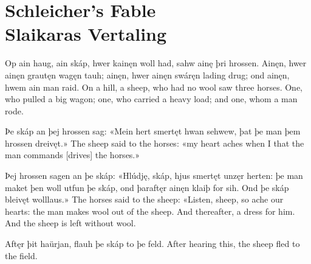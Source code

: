 \section{Schleicher's Fable\\Slaikaras Vertaling}

\begin{paracol}{2}
Op ain haug, ain skáp, hwer kainęn woll had, sahw ainę þri hrossen. Ainęn, hwer ainęn grautęn wagęn tauh; ainęn, hwer ainęn swáręn lading drug; ond ainęn, hwem ain man raid.
\switchcolumn
On a hill, a sheep, who had no wool saw three horses. One, who pulled a big wagon; one, who carried a heavy load; and one, whom a man rode.
\end{paracol}

\begin{paracol}{2}
Þe skáp an þej hrossen sag: «Mein hert smertęt hwan sehwew, þat þe man þem hrossen dreivęt.»
\switchcolumn
The sheep said to the horses: «my heart aches when I that the man commands [drives] the horses.»
\end{paracol}

\begin{paracol}{2}
Þej hrossen sagen an þe skáp: «Hlúdję, skáp, hjus smertęt unzęr herten: þe man maket þen woll utfun þe skáp, ond þaraftęr ainęn klaiþ for sih. Ond þe skáp bleivęt wolllaus.»
\switchcolumn
The horses said to the sheep: «Listen, sheep, so ache our hearts: the man makes wool out of the sheep. And thereafter, a dress for him. And the sheep is left without wool.
\end{paracol}

\begin{paracol}{2}
Aftęr þit haürjan, flauh þe skáp to þe feld.
\switchcolumn
After hearing this, the sheep fled to the field.
\end{paracol}
